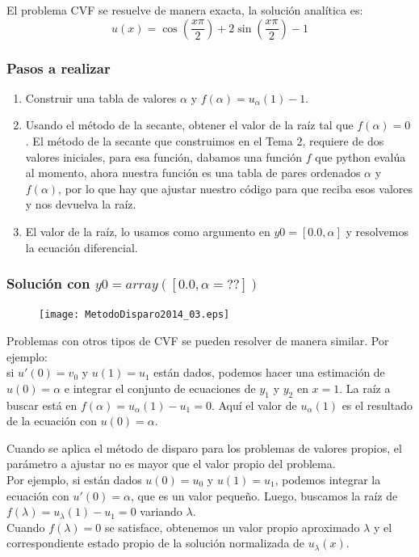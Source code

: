 \begin{frame}
El problema CVF se resuelve de manera exacta, la solución analítica es:
\begin{equation}
u(x) = \cos\left(\frac{x \pi}{2}\right) + 2 \sin \left(\frac{x \pi}{2}\right) -1
\end{equation}
\end{frame}
\begin{frame}
\frametitle{Pasos a realizar}
\begin{enumerate}
\item Construir una tabla de valores $\alpha$ y $f(\alpha) = u_{\alpha}(1) - 1$.
\item Usando el método de la secante, obtener el valor de la raíz tal que $f(\alpha)=0$. El método de la secante que construimos en el Tema 2, requiere de dos valores iniciales, para esa función, dabamos una función $f$ que python evalúa al momento, ahora nuestra función es una tabla de pares ordenados $\alpha$ y $f(\alpha)$, por lo que hay que ajustar nuestro código para que reciba esos valores y nos devuelva la raíz.
\item El valor de la raíz, lo usamos como argumento en $y0=[0.0, \alpha]$ y resolvemos la ecuación diferencial.
\end{enumerate}
\end{frame}
\begin{frame}[fragile]
\frametitle{Solución con $y0 = array([0.0,\alpha=??])$}
\begin{figure}
	\centering
	\texttt{[image: MetodoDisparo2014\_03.eps]}
\end{figure}
\end{frame}
\begin{frame}
Problemas con otros tipos de CVF se pueden resolver de manera similar. Por ejemplo:
\\
\medskip
si $u'(0)=v_{0}$ y $u(1)=u_{1}$ están dados, podemos hacer una estimación de $u(0)=\alpha$ e integrar el conjunto de ecuaciones de $y_{1}$ y $y_{2}$ en $x=1$. La raíz a buscar está en $f(\alpha) = u_{\alpha}(1) - u_{1} = 0$. Aquí el valor de $u_{\alpha}(1)$ es el resultado de la ecuación con $u(0)=\alpha$.
\end{frame}
\begin{frame}
Cuando se aplica el método de disparo para los problemas de valores propios, el parámetro a ajustar no es mayor que el valor propio del problema.
\\
\medskip
Por ejemplo, si están dados $u(0)=u_{0}$ y $u(1)=u_{1}$, podemos integrar la ecuación con $u'(0)= \alpha$, que es un valor pequeño. Luego, buscamos la raíz de $f(\lambda) = u_{\lambda}(1) - u_{1}=0$ variando $\lambda$.
\\
\medskip
Cuando $f(\lambda)=0$ se satisface, obtenemos un valor propio aproximado $\lambda$ y el correspondiente estado propio de la solución normalizada de $u_{\lambda}(x)$.
\end{frame}
